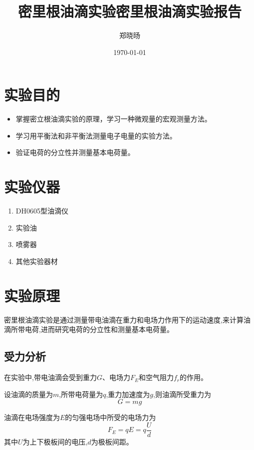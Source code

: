 \documentclass[UTF8]{ctexart}
\title{密里根油滴实验}
\title{密里根油滴实验报告}
\author{郑晓旸}
\date{\today}
\begin{document}
\fancyfoot[C]{\thepage}

\maketitle
\tableofcontents
\newpage

\section{实验目的}
\begin{itemize}
    \item 掌握密立根油滴实验的原理，学习一种微观量的宏观测量方法。
    \item 学习用平衡法和非平衡法测量电子电量的实验方法。
    \item 验证电荷的分立性并测量基本电荷量。
\end{itemize}

\section{实验仪器}
\begin{enumerate}
    \item DH0605型油滴仪
    \item 实验油
    \item 喷雾器
    \item 其他实验器材
\end{enumerate}

\section{实验原理}

密里根油滴实验是通过测量带电油滴在重力和电场力作用下的运动速度,来计算油滴所带电荷,进而研究电荷的分立性和测量基本电荷量。

\subsection{受力分析}
在实验中,带电油滴会受到重力$G$、电场力$F_E$和空气阻力$f_r$的作用。

设油滴的质量为$m$,所带电荷量为$q$,重力加速度为$g$,则油滴所受重力为
\begin{equation}
    G = mg
\end{equation}

油滴在电场强度为$E$的匀强电场中所受的电场力为
\begin{equation}
    F_E = qE = q\frac{U}{d}
\end{equation}
其中$U$为上下极板间的电压,$d$为极板间距。
\end{document}
